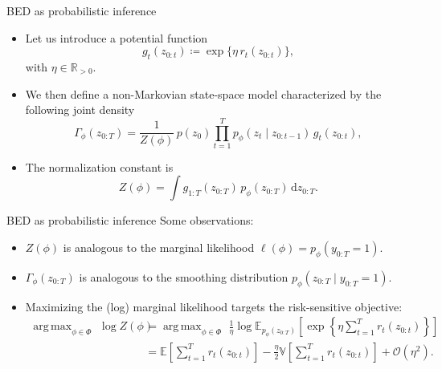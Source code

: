 \documentclass[10pt, aspectratio=1610]{beamer}
\DeclareMathOperator*{\argmax}{arg\,max}
\newcommand{\dd}{\mathrm{d}}
\begin{document}
    \begin{frame}{BED as probabilistic inference}
      \begin{itemize}[<+->]
        \item Let us introduce a potential function
          \begin{equation}\label{eq:potential-function}
            g_{t}(z_{0:t}) \coloneq \exp \Big\{ \eta \, r_{t}(z_{0:t}) \Big\},
          \end{equation}
          with $\eta \in \mathbb{R}_{>0}$.
        \item We then define a non-Markovian state-space model characterized by the following joint density
          \begin{equation}\label{eq:pathwise_smoothing_trajectory}
            \Gamma_\phi(z_{0:T}) = \frac{1}{Z(\phi)} \, p(z_0) \prod_{t=1}^T p_\phi(z_t \mid z_{0:t-1}) \, g_t(z_{0:t}),
          \end{equation}
        \item The normalization constant is
          \begin{equation}
            Z(\phi) = \int g_{1:T}(z_{0:T}) \, p_\phi(z_{0:T}) \, \dd z_{0:T}.
          \end{equation}
      \end{itemize}
    \end{frame}

    \begin{frame}{BED as probabilistic inference}
      Some observations:
      \begin{itemize}
        \item $Z(\phi)$ is analogous to the marginal likelihood $\ell(\phi) = p_\phi(y_{0:T} = 1)$.
        \item $\Gamma_\phi(z_{0:T})$ is analogous to the smoothing distribution $p_\phi(z_{0:T} \mid y_{0:T} = 1)$.
        \item Maximizing the (log) marginal likelihood targets the risk-sensitive objective:
          \begin{align}
            \argmax_{\phi \in \Phi} \,\, \log Z(\phi) &= \argmax_{\phi \in \Phi} \,\, \frac{1}{\eta} \log \mathbb{E}_{p_\phi(z_{0:T})} \left[\exp \left\{\eta \sum_{t=1}^T r_t(z_{0:t})\right\}\right] \\
            &= \mathbb{E} \left[\sum_{t=1}^T r_t(z_{0:t})\right] - \frac{\eta}{2} \mathbb{V} \left[ \sum_{t=1}^T r_t(z_{0:t}) \right] + \mathcal{O}(\eta^2).
          \end{align}
      \end{itemize}
    \end{frame}
\end{document}
